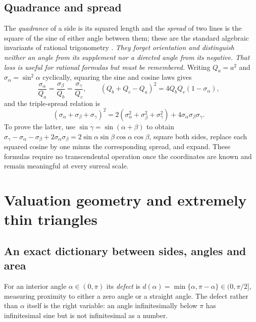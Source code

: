 \documentclass[11pt,letterpaper]{article}
\numberwithin{equation}{section}
\theoremstyle{definition}
\theoremstyle{remark}
\begin{document}
\subsection{Quadrance and spread}
The \emph{quadrance} of a side is its squared length and the \emph{spread} of two lines is the
square of the sine of either angle between them; these are the standard algebraic invariants of
rational trigonometry \cite{Wildberger,Gunn}. \emph{They forget orientation and distinguish neither
an angle from its supplement nor a directed angle from its negative. That loss is useful for
rational formulas but must be remembered.} Writing $Q_a=a^2$ and $\sigma_\alpha=\sin^2\alpha$
cyclically, squaring the sine and cosine laws gives
\begin{equation}\label{trigonometry:eq:spreadlaws}
 \frac{\sigma_\alpha}{Q_a}=\frac{\sigma_\beta}{Q_b}=\frac{\sigma_\gamma}{Q_c},
 \qquad
 (Q_b+Q_c-Q_a)^2=4Q_bQ_c(1-\sigma_\alpha),
\end{equation}
and the triple-spread relation is
\begin{equation}\label{trigonometry:eq:triplespread}
 (\sigma_\alpha+\sigma_\beta+\sigma_\gamma)^2
 =2(\sigma_\alpha^2+\sigma_\beta^2+\sigma_\gamma^2)+4\sigma_\alpha\sigma_\beta\sigma_\gamma .
\end{equation}
To prove the latter, use $\sin\gamma=\sin(\alpha+\beta)$ to obtain
$\sigma_\gamma-\sigma_\alpha-\sigma_\beta+2\sigma_\alpha\sigma_\beta
=2\sin\alpha\sin\beta\cos\alpha\cos\beta$, square both sides, replace each squared cosine by one
minus the corresponding spread, and expand. These formulas require no transcendental operation once
the coordinates are known and remain meaningful at every surreal scale.

\section{Valuation geometry and extremely thin triangles}
\label{trigonometry:sec:valuationgeometry}

\subsection{An exact dictionary between sides, angles and area}
For an interior angle $\alpha\in(0,\pi)$ its \emph{defect} is
$d(\alpha)=\min\{\alpha,\pi-\alpha\}\in(0,\pi/2]$, measuring proximity to either a zero angle or a
straight angle. The defect rather than $\alpha$ itself is the right variable: an angle
infinitesimally below $\pi$ has infinitesimal sine but is not infinitesimal as a number.
\end{document}

